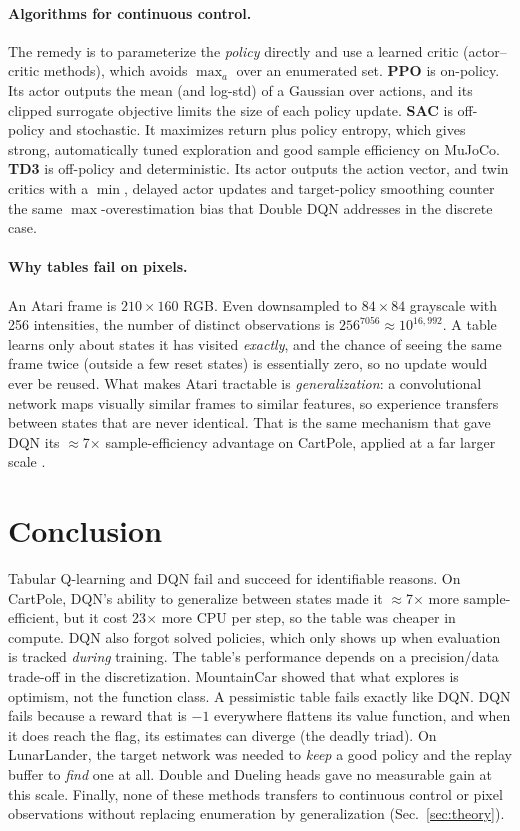 \paragraph{Algorithms for continuous control.} The remedy is to parameterize the \emph{policy} directly
and use a learned critic (actor--critic methods), which avoids $\max_a$ over an enumerated set.
\textbf{PPO} \citep{schulman2017} is on-policy. Its actor outputs the mean (and log-std) of a Gaussian
over actions, and its clipped surrogate objective limits the size of each policy update.
\textbf{SAC} \citep{haarnoja2018} is off-policy and stochastic. It maximizes return plus policy entropy,
which gives strong, automatically tuned exploration and good sample efficiency on MuJoCo.
\textbf{TD3} \citep{fujimoto2018} is off-policy and deterministic. Its actor outputs the action vector,
and twin critics with a $\min$, delayed actor updates and target-policy smoothing counter the same
$\max$-overestimation bias that Double DQN addresses in the discrete case.

\paragraph{Why tables fail on pixels.} An Atari frame is $210\times160$ RGB. Even downsampled to
$84\times84$ grayscale with 256 intensities, the number of distinct observations is
$256^{7056}\approx10^{16{,}992}$. A table learns only about states it has visited \emph{exactly}, and the
chance of seeing the same frame twice (outside a few reset states) is essentially zero, so no update
would ever be reused. What makes Atari tractable is \emph{generalization}: a convolutional network maps
visually similar frames to similar features, so experience transfers between states that are never
identical. That is the same mechanism that gave DQN its $\approx$7$\times$ sample-efficiency advantage on
CartPole, applied at a far larger scale \citep{mnih2015}.

\section{Conclusion}
Tabular Q-learning and DQN fail and succeed for identifiable reasons. On CartPole, DQN's ability to
generalize between states made it $\approx$7$\times$ more sample-efficient, but it cost 23$\times$ more
CPU per step, so the table was cheaper in compute. DQN also forgot solved policies, which only shows
up when evaluation is tracked \emph{during} training. The table's performance depends on a precision/data
trade-off in the discretization. MountainCar showed that what explores is optimism, not the function
class. A pessimistic table fails exactly like DQN. DQN fails because a reward that is $-1$ everywhere
flattens its value function, and when it does reach the flag, its estimates can diverge (the deadly
triad). On LunarLander, the target network was needed to \emph{keep} a good policy and the replay
buffer to \emph{find} one at all. Double and Dueling heads gave no measurable gain at this scale.
Finally, none of these methods transfers to continuous control or pixel observations without replacing
enumeration by generalization (Sec.~\ref{sec:theory}).


